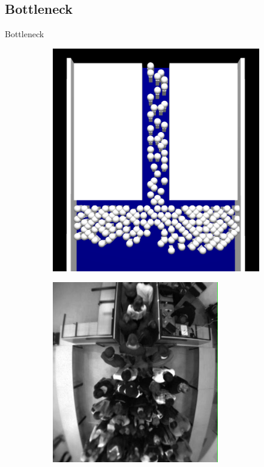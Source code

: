 \subsection{Bottleneck}
\begin{frame}{Bottleneck}

\begin{figure}
\centering
\begin{subfigure}{.5\textwidth}
  \centering
  \includegraphics[width=.9\linewidth]{obrazek-bottleneck}
\end{subfigure}%
\begin{subfigure}{.5\textwidth}
  \centering
  \includegraphics[width=.9\linewidth]{obrazek-bottleneck-real}
\end{subfigure}
\label{fig:test}
\end{figure}

\end{frame}